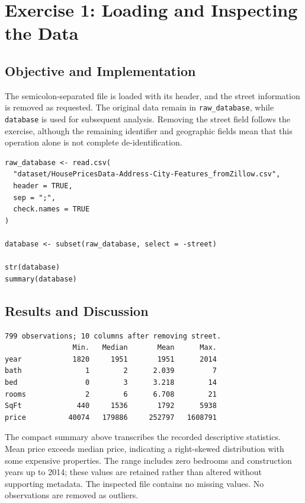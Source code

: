 \documentclass[11pt,a4paper]{article}
\begin{document}
\section{Exercise 1: Loading and Inspecting the Data}
\subsection{Objective and Implementation}
The semicolon-separated file is loaded with its header, and the street information is removed as requested. The original data remain in \texttt{raw\_database}, while \texttt{database} is used for subsequent analysis. Removing the street field follows the exercise, although the remaining identifier and geographic fields mean that this operation alone is not complete de-identification.
\begin{lstlisting}
raw_database <- read.csv(
  "dataset/HousePricesData-Address-City-Features_fromZillow.csv",
  header = TRUE,
  sep = ";",
  check.names = TRUE
)

database <- subset(raw_database, select = -street)

str(database)
summary(database)
\end{lstlisting}

\subsection{Results and Discussion}
\par\noindent\begin{minipage}{\linewidth}
\begin{lstlisting}[style=console]
799 observations; 10 columns after removing street.
                Min.   Median       Mean      Max.
year            1820     1951       1951      2014
bath               1        2      2.039         7
bed                0        3      3.218        14
rooms              2        6      6.708        21
SqFt             440     1536       1792      5938
price          40074   179886     252797   1608791
\end{lstlisting}
\end{minipage}\par
The compact summary above transcribes the recorded descriptive statistics. Mean price exceeds median price, indicating a right-skewed distribution with some expensive properties. The range includes zero bedrooms and construction years up to 2014; these values are retained rather than altered without supporting metadata. The inspected file contains no missing values. No observations are removed as outliers.
\end{document}
